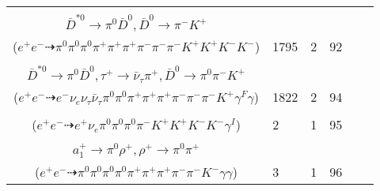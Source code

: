 \documentclass[landscape]{article}
\newcounter{rownumbers}
\newcommand\rn{\stepcounter{rownumbers}\arabic{rownumbers}}
\newcommand{\EOLP}{\\ \hline} %
\newcommand{\topoTags}[1]{#1} %
\begin{document}
\begin{longtable}{clcccc}
\rn & \makecell[l]{ $ 
e^{+} e^{-} \rightarrow \pi^{+} \omega K^{-} D_{s}^{+} D_{1}^{\prime-} ,
\omega \rightarrow \pi^{0} \pi^{+} \pi^{-} ,
D_{s}^{+} \rightarrow \rho^{+} \phi ,
D_{1}^{\prime-} \rightarrow \pi^{-} \bar{D}^{*0} ,
\rho^{+} \rightarrow \pi^{0} \pi^{+} ,
\phi \rightarrow K^{+} K^{-} ,
$ \\ $
\bar{D}^{*0} \rightarrow \pi^{0} \bar{D}^{0} ,
\bar{D}^{0} \rightarrow \pi^{-} K^{+} 
$ \\ ($
e^{+} e^{-} \dashrightarrow \pi^{0} \pi^{0} \pi^{0} \pi^{+} \pi^{+} \pi^{+} \pi^{-} \pi^{-} \pi^{-} K^{+} K^{+} K^{-} K^{-} 
$) } & \topoTags{1795 & }2 & 92 \EOLP

\rn & \makecell[l]{ $ 
e^{+} e^{-} \rightarrow \pi^{+} \pi^{-} \bar{K}^{0} D_{s}^{*+} D_{1}^{\prime-} ,
\bar{K}^{0} \rightarrow K_{L}^{0} ,
D_{s}^{*+} \rightarrow D_{s}^{+} \gamma ,
D_{1}^{\prime-} \rightarrow \pi^{-} \bar{D}^{*0} ,
K_{L}^{0} \rightarrow e^{-} \nu_{e} \pi^{+} \gamma^{F} ,
D_{s}^{+} \rightarrow \tau^{+} \nu_{\tau} ,
$ \\ $
\bar{D}^{*0} \rightarrow \pi^{0} \bar{D}^{0} ,
\tau^{+} \rightarrow \bar{\nu}_{\tau} \pi^{+} ,
\bar{D}^{0} \rightarrow \pi^{0} \pi^{-} K^{+} 
$ \\ ($
e^{+} e^{-} \dashrightarrow e^{-} \nu_{e} \nu_{\tau} \bar{\nu}_{\tau} \pi^{0} \pi^{0} \pi^{+} \pi^{+} \pi^{+} \pi^{-} \pi^{-} \pi^{-} K^{+} \gamma^{F} \gamma 
$) } & \topoTags{1822 & }2 & 94 \EOLP

\rn & \makecell[l]{ $ 
e^{+} e^{-} \rightarrow K^{+} K^{-} D^{0} \bar{D}^{*0} \gamma^{I} ,
D^{0} \rightarrow e^{+} \nu_{e} K^{-} ,
\bar{D}^{*0} \rightarrow \pi^{0} \bar{D}^{0} ,
\bar{D}^{0} \rightarrow \pi^{0} \pi^{0} \pi^{-} K^{+} 
$ \\ ($
e^{+} e^{-} \dashrightarrow e^{+} \nu_{e} \pi^{0} \pi^{0} \pi^{0} \pi^{-} K^{+} K^{+} K^{-} K^{-} \gamma^{I} 
$) } & \topoTags{2 & }1 & 95 \EOLP

\rn & \makecell[l]{ $ 
e^{+} e^{-} \rightarrow \pi^{0} \pi^{-} D^{*+} \bar{D}^{0} ,
D^{*+} \rightarrow \pi^{+} D^{0} ,
\bar{D}^{0} \rightarrow \pi^{0} \eta K_{S}^{0} ,
D^{0} \rightarrow K^{-} a_{1}^{+} ,
\eta \rightarrow \gamma \gamma ,
K_{S}^{0} \rightarrow \pi^{+} \pi^{-} ,
$ \\ $
a_{1}^{+} \rightarrow \pi^{0} \rho^{+} ,
\rho^{+} \rightarrow \pi^{0} \pi^{+} 
$ \\ ($
e^{+} e^{-} \dashrightarrow \pi^{0} \pi^{0} \pi^{0} \pi^{0} \pi^{+} \pi^{+} \pi^{+} \pi^{-} \pi^{-} K^{-} \gamma \gamma 
$) } & \topoTags{3 & }1 & 96 \EOLP


\end{longtable}
\end{document}
